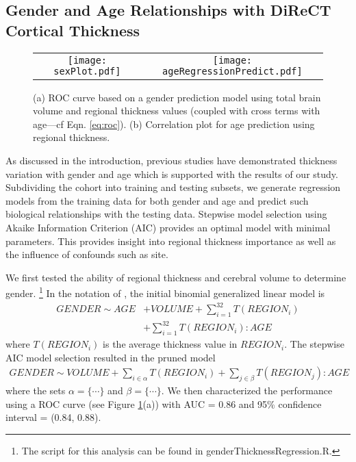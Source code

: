 \subsection{Gender and Age Relationships with DiReCT Cortical Thickness}

\begin{figure}
  \centering
  \begin{tabular}{cc}
  \texttt{[image: sexPlot.pdf]} &
  \texttt{[image: ageRegressionPredict.pdf]} 
  \end{tabular}
  \caption{(a) ROC curve based on a gender prediction model using total brain volume and regional thickness values (coupled with cross terms with age---cf Eqn. \ref{eq:roc}).  
  (b) Correlation plot for age prediction using regional thickness.
  }
  \label{fig:sexROC}
\end{figure}

As discussed in the introduction, previous studies have demonstrated 
thickness variation with gender and age which is supported with
the results of our study.  Subdividing the cohort into training and
testing subsets, we generate regression models from the training data
for both gender and age and predict such biological relationships with 
the testing data. Stepwise model selection using Akaike Information Criterion
(AIC) provides an optimal model with minimal parameters.  This provides 
insight into regional thickness importance as well
as the influence of confounds such as site.

We first tested the ability of regional thickness and cerebral volume to determine
gender.%
\footnote{
The script for this analysis can be found in genderThicknessRegression.R.
}
In the notation of \cite{wilkinson1973}, the initial binomial 
generalized linear model is
\begin{align}
  GENDER \sim AGE &+ VOLUME + \sum_{i=1}^{32} T(REGION_{i}) \\ \nonumber
              &+\sum_{i=1}^{32} T(REGION_{i}):AGE
\end{align}
where $T(REGION_{i})$ is the average thickness value in $REGION_{i}$.
The stepwise AIC model selection resulted in the pruned model
\begin{align}
  \label{eq:roc}
  GENDER \sim VOLUME + \sum_{i \in \alpha} T(REGION_i) + \sum_{j \in \beta} T(REGION_j):AGE
\end{align}
where the sets $\alpha = \{\cdots\}$ and $\beta = \{\cdots\}$.  We then characterized the performance using a ROC curve (see Figure \ref{fig:sexROC}(a)) with AUC = 0.86 and 95\% confidence interval = (0.84, 0.88). 
   
